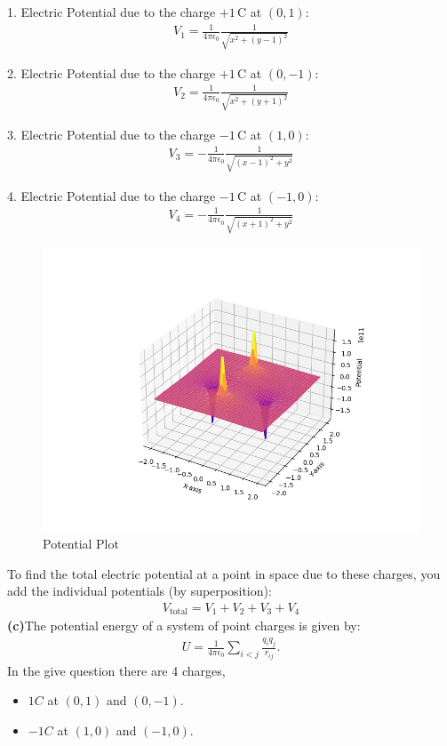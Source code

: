 \documentclass{article}
\begin{document}
1. Electric Potential due to the charge $ +1\,\mathrm{C} $ at $ (0, 1) $:
   \begin{align*}
   V_1 = \frac{1}{4\pi\epsilon_0} \frac{1}{\sqrt{x^2 + (y-1)^2}}
   \end{align*}

2. Electric Potential due to the charge $ +1\,\mathrm{C} $ at $ (0, -1) $:
   \begin{align*}
   V_2 = \frac{1}{4\pi\epsilon_0} \frac{1}{\sqrt{x^2 + (y+1)^2}}
   \end{align*}

3. Electric Potential due to the charge $ -1\,\mathrm{C} $ at $ (1, 0) $:
   \begin{align*}
   V_3 = -\frac{1}{4\pi\epsilon_0} \frac{1}{\sqrt{(x-1)^2 + y^2}}
   \end{align*}

4. Electric Potential due to the charge $ -1\,\mathrm{C} $ at $ (-1, 0) $:
   \begin{align*}
   V_4 = -\frac{1}{4\pi\epsilon_0} \frac{1}{\sqrt{(x+1)^2 + y^2}}
   \end{align*}
\begin{figure}[h!]
   \centering
   \includegraphics[width=0.6\columnwidth]{figs/pot.png}
    \caption{{Potential Plot}}
   \label{label}
\end{figure}
\pagebreak
To find the total electric potential at a point in space due to these charges, you add the individual potentials (by superposition):
\begin{align*}
V_{\text{total}} = V_1 + V_2 + V_3 + V_4
\end{align*}
   \textbf{(c)}The potential energy of a system of point charges is given by:
\begin{align*}
U = \frac{1}{4\pi\epsilon_0} \sum_{i < j} \frac{q_i q_j}{r_{ij}}.
\end{align*}
In the give question there are 4 charges,
\begin{itemize}
    \item $1C$ at $(0,1)$ and $(0,-1)$.
    \item $-1C$ at $(1,0)$ and $(-1,0)$.
\end{itemize}
\end{document}

